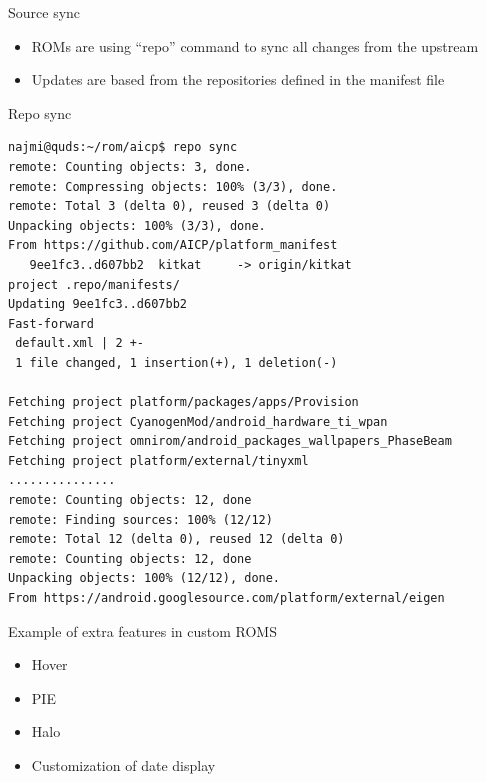 \documentclass{beamer}
\begin{document}
\begin{frame}{Source sync}
\begin{itemize}
 \item ROMs are using ``repo'' command to sync all changes from the upstream
 \item Updates are based from the repositories defined in the manifest file
\end{itemize} 
\end{frame}

\begin{frame}[fragile]{Repo sync}
\tiny \begin{verbatim}
najmi@quds:~/rom/aicp$ repo sync
remote: Counting objects: 3, done.
remote: Compressing objects: 100% (3/3), done.
remote: Total 3 (delta 0), reused 3 (delta 0)
Unpacking objects: 100% (3/3), done.
From https://github.com/AICP/platform_manifest
   9ee1fc3..d607bb2  kitkat     -> origin/kitkat
project .repo/manifests/
Updating 9ee1fc3..d607bb2
Fast-forward
 default.xml | 2 +-
 1 file changed, 1 insertion(+), 1 deletion(-)

Fetching project platform/packages/apps/Provision
Fetching project CyanogenMod/android_hardware_ti_wpan
Fetching project omnirom/android_packages_wallpapers_PhaseBeam
Fetching project platform/external/tinyxml
...............
remote: Counting objects: 12, done
remote: Finding sources: 100% (12/12)
remote: Total 12 (delta 0), reused 12 (delta 0)
remote: Counting objects: 12, done
Unpacking objects: 100% (12/12), done. 
From https://android.googlesource.com/platform/external/eigen
\end{verbatim}
\end{frame}

\begin{frame}
Example of extra features in custom ROMS
 \begin{itemize}
  \item Hover
  \item PIE
  \item Halo
  \item Customization of date display
 \end{itemize}

\end{frame}

   
   
\end{document}

